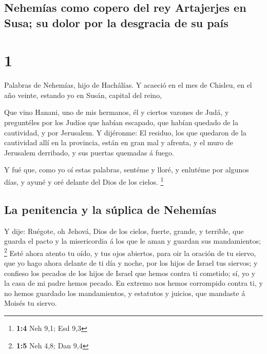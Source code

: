\hypertarget{nehemuxedas-como-copero-del-rey-artajerjes-en-susa-su-dolor-por-la-desgracia-de-su-pauxeds}{%
\subsection{Nehemías como copero del rey Artajerjes en Susa; su dolor
por la desgracia de su
país}\label{nehemuxedas-como-copero-del-rey-artajerjes-en-susa-su-dolor-por-la-desgracia-de-su-pauxeds}}

\hypertarget{section}{%
\section{1}\label{section}}

 Palabras de Nehemías, hijo de Hachâlías. Y acaeció en el
mes de Chisleu, en el año veinte, estando yo en Susán, capital del
reino,

 Que vino Hanani, uno de mis hermanos, él y ciertos
varones de Judá, y preguntéles por los Judíos que habían escapado, que
habían quedado de la cautividad, y por Jerusalem.  Y
dijéronme: El residuo, los que quedaron de la cautividad allí en la
provincia, están en gran mal y afrenta, y el muro de Jerusalem
derribado, y sus puertas quemadas á fuego.

 Y fué que, como yo oí estas palabras, sentéme y lloré, y
enlutéme por algunos días, y ayuné y oré delante del Dios de los cielos.
\footnote{\textbf{1:4} Neh 9,1; Esd 9,3}

\hypertarget{la-penitencia-y-la-suxfaplica-de-nehemuxedas}{%
\subsection{La penitencia y la súplica de
Nehemías}\label{la-penitencia-y-la-suxfaplica-de-nehemuxedas}}

 Y dije: Ruégote, oh Jehová, Dios de los cielos, fuerte,
grande, y terrible, que guarda el pacto y la misericordia á los que le
aman y guardan sus mandamientos; \footnote{\textbf{1:5} Neh 4,8; Dan 9,4}
 Esté ahora atento tu oído, y tus ojos abiertos, para oir
la oración de tu siervo, que yo hago ahora delante de ti día y noche,
por los hijos de Israel tus siervos; y confieso los pecados de los hijos
de Israel que hemos contra ti cometido; sí, yo y la casa de mi padre
hemos pecado.  En extremo nos hemos corrompido contra ti,
y no hemos guardado los mandamientos, y estatutos y juicios, que
mandaste á Moisés tu siervo.

